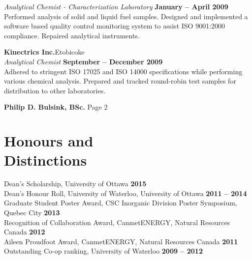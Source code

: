 \documentclass[margin,line]{resume}
\begin{document}
\begin{resume}
    \textsl{Analytical Chemist - Characterization Laboratory} \hfill \textbf{January -- April 2009}\\
    Performed analysis of solid and liquid fuel samples. Designed and implemented a software based quality control monitoring system to assist ISO 9001:2000 compliance. Repaired analytical instruments.

    \textbf{Kinectrics Inc.}\hfill Etobicoke\\\vspace{1mm}%
    \textsl{Analytical Chemist} \hfill \textbf{September -- December 2009}\\
    Adhered to stringent ISO 17025 and ISO 14000 specifications while performing various chemical analysis. Prepared and tracked round-robin test samples for distribution to other laboratories.

\newpage
	\textbf{Philip D. Bulsink, BSc.} \hspace{279pt} Page 2 \\
	\vspace{-4mm}
    \section{\mysidestyle Honours and\\Distinctions} 

	Dean's Scholarship, University of Ottawa \hfill \textbf{2015}\vspace{1mm}\\
    Dean's Honour Roll, University of Waterloo, University of Ottawa \hfill \textbf{2011 -- 2014}\vspace{1mm}\\%
    Graduate Student Poster Award, CSC Inorganic Division Poster Symposium, Quebec City \hfill \textbf{2013}\vspace{1mm}\\%
    Recognition of Collaboration Award, CanmetENERGY, Natural Resources Canada \hfill \textbf{2012}\vspace{1mm}\\%
    Aileen Proudfoot Award, CanmetENERGY, Natural Resources Canada \hfill \textbf{2011}\vspace{1mm}\\%
    Outstanding Co-op ranking, University of Waterloo \hfill \textbf{2009 -- 2012}\vspace{1mm}%



\end{resume}
\end{document}
